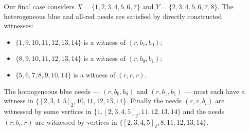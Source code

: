 \documentclass{article}
\theoremstyle{definition}
\begin{document}
Our final case considers $X = \{1,2,3,4,5,6,7\}$ and $Y = \{2,3,4,5,6,7,8\}$.
The heterogeneous blue and all-red needs are satisfied by directly constructed
witnesses:
\begin{itemize}
\item $\{1,9,10,11,12,13,14\}$ is a witness of $(r,b_{1},b_{0})$;
\item $\{8,9,10,11,12,13,14\}$ is a witness of $(r,b_{0},b_{1})$;
\item $\{5,6,7,8,9,10,14\}$ is a witness of $(r,r,r)$.
\end{itemize}
The homogeneous blue needs --- $(r,b_{0},b_{0})$ and $(r,b_{1},b_{1})$ --- must
each have a witness in $\{[2,3,4,5]_{2},10,11,12,13,14\}$.  Finally the needs
$(r,r,b_{i})$ are witnessed by some vertices in
$\{1,[2,3,4,5]_{2},11,12,13,14\}$ and the needs $(r,b_{i},r)$ are witnessed by
vertices in $\{[2,3,4,5]_{2},8,11,12,13,14\}$.
\end{document}

